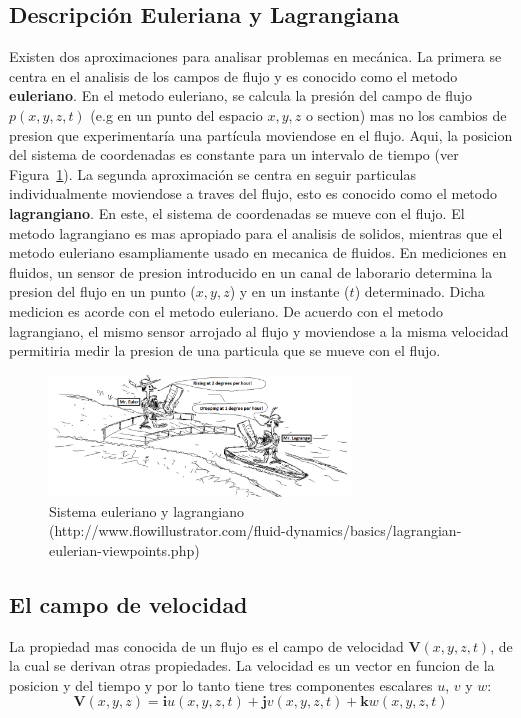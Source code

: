 \documentclass[10pt, oneside]{article}
\begin{document}
\subsection{Descripci\'on Euleriana y Lagrangiana}
Existen dos aproximaciones para analisar problemas en mec\'anica. La primera se centra en el analisis de los campos de flujo y es conocido como el metodo \textbf{euleriano}.  En el metodo euleriano, se calcula la presi\'on del campo de flujo $p(x,y,z,t)$  (e.g en un punto del espacio $x,y,z$ o section) mas no los cambios de presion que experimentar\'ia una part\'icula moviendose en el flujo. Aqui, la posicion del sistema de coordenadas es constante para un intervalo de tiempo (ver Figura~\ref{eulan}).
La segunda aproximaci\'on se centra en seguir particulas individualmente moviendose a traves del flujo, esto es conocido como el metodo \textbf{lagrangiano}. En este, el sistema de coordenadas se mueve con el flujo. El metodo lagrangiano es mas apropiado para el analisis de solidos, mientras que el metodo euleriano esampliamente usado en mecanica de fluidos. 
En mediciones en fluidos, un sensor de presion introducido en un canal de laborario determina la presion del flujo en un punto ($x,y,z$) y en un instante ($t$) determinado. Dicha medicion es acorde con el metodo euleriano. De acuerdo con el metodo lagrangiano,  el mismo sensor arrojado al flujo y moviendose a la misma velocidad permitiria medir la presion de una particula que se mueve con el flujo.

\begin{figure}[h]
\centering
\includegraphics[width=8cm]{MaterialDerivative}
\caption{Sistema euleriano y lagrangiano (http://www.flowillustrator.com/fluid-dynamics/basics/lagrangian-eulerian-viewpoints.php)}
\label{eulan}
\end{figure}

\subsection{El campo de velocidad}
La   propiedad mas conocida de un flujo es el campo de velocidad $\mathbf{V}(x,y,z,t)$, de la cual se derivan otras propiedades. La velocidad es un vector en funcion de la posicion y del tiempo y por lo tanto tiene tres componentes escalares $u$, $v$ y $w$:
$$
\mathbf{V}(x,y,z)=\mathbf{i}u(x,y,z,t) + \mathbf{j}v(x,y,z,t) + \mathbf{k}w(x,y,z,t)
$$
\end{document}
